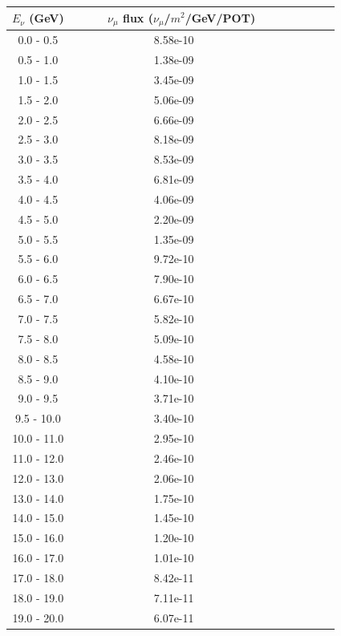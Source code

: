 \documentclass[aps, prd, reprint,showpacs,  preprintnumbers,amsmath,amssymb,superscriptaddress, nofootinbib]{revtex4-1}
\makeatletter
\renewenvironment{table}
  {\def\@captype{table}}
  {}
\makeatother
\begin{document}
\begin{table}
\centering
\begin{tabular}{ccccccc}
\hline
$E_\nu$ (GeV) & ~~~~~$\nu_\mu$ flux ($\nu_\mu$/$m^2$/GeV/POT)  ~~\\
\hline
     0.0 - 0.5 & 8.58e-10 \\
     0.5 - 1.0 & 1.38e-09 \\
     1.0 - 1.5 & 3.45e-09 \\
     1.5 - 2.0 & 5.06e-09 \\
     2.0 - 2.5 & 6.66e-09 \\
     2.5 - 3.0 & 8.18e-09 \\
     3.0 - 3.5 & 8.53e-09 \\
     3.5 - 4.0 & 6.81e-09 \\
     4.0 - 4.5 & 4.06e-09 \\
     4.5 - 5.0 & 2.20e-09 \\
     5.0 - 5.5 & 1.35e-09 \\
     5.5 - 6.0 & 9.72e-10 \\
     6.0 - 6.5 & 7.90e-10 \\
     6.5 - 7.0 & 6.67e-10 \\
     7.0 - 7.5 & 5.82e-10 \\
     7.5 - 8.0 & 5.09e-10 \\
     8.0 - 8.5 & 4.58e-10 \\
     8.5 - 9.0 & 4.10e-10 \\
     9.0 - 9.5 & 3.71e-10 \\
    9.5 - 10.0 & 3.40e-10 \\
   10.0 - 11.0 & 2.95e-10 \\
   11.0 - 12.0 & 2.46e-10 \\
   12.0 - 13.0 & 2.06e-10 \\
   13.0 - 14.0 & 1.75e-10 \\
   14.0 - 15.0 & 1.45e-10 \\
   15.0 - 16.0 & 1.20e-10 \\
   16.0 - 17.0 & 1.01e-10 \\
   17.0 - 18.0 & 8.42e-11 \\
   18.0 - 19.0 & 7.11e-11 \\
   19.0 - 20.0 & 6.07e-11 \\
\hline
\end{tabular}
\caption{The neutrino flux used for the cross-section calculations.
This flux is also used by the GENIE and NuWro event generators to produce the model predictions
shown in the paper.}
\label{tb:flux-table}
\end{table}
\end{document}
